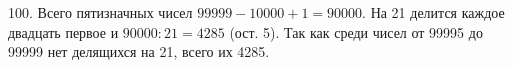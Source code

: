100. Всего пятизначных чисел $99999-10000+1=90000.$ На 21 делится каждое двадцать первое и $90000:21=4285$ (ост. 5). Так как среди чисел от 99995 до 99999 нет делящихся на 21, всего их 4285.\\
